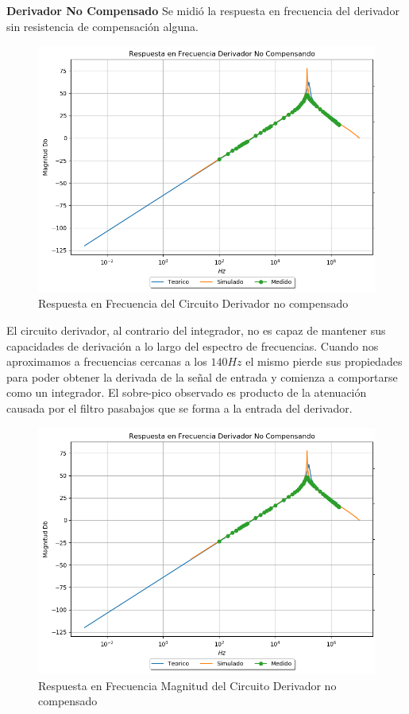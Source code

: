\textbf{Derivador No Compensado}
Se midió la respuesta en frecuencia del derivador sin resistencia de compensación alguna.
\begin{figure}[H]
	\centering
	\includegraphics[width=\textwidth]{Ejercicio4/SUPERPOSICION-BODE-DERIVADOR-NO-COMPENSADO}
	\caption{Respuesta en Frecuencia del Circuito Derivador no compensado}
\end{figure}
El circuito derivador, al contrario del integrador, no es capaz de mantener sus capacidades de derivación a lo largo del espectro de frecuencias. Cuando nos aproximamos a frecuencias cercanas a los $140Hz$ el mismo pierde sus propiedades para poder obtener la derivada de la señal de entrada y comienza a comportarse como un integrador. 
El sobre-pico observado es producto de la atenuación causada por el filtro pasabajos que se forma a la entrada del derivador.


\begin{figure}[H]
	\centering
	\includegraphics[width=\textwidth]{Ejercicio4/SUPERPOSICION-BODE-DERIVADOR-NO-COMPENSADO}
	\caption{Respuesta en Frecuencia Magnitud del Circuito Derivador no compensado}
\end{figure}

